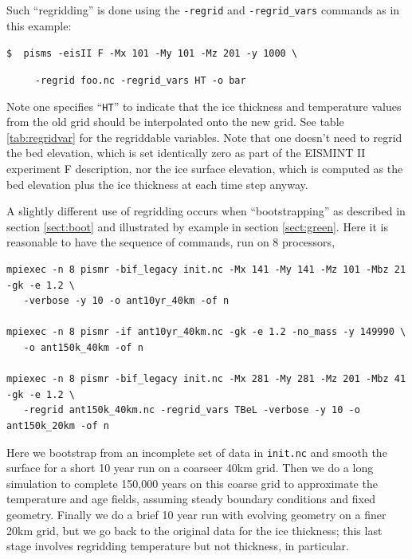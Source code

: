 \documentclass[11pt,final]{amsart}
\begin{document}
Such ``regridding'' is done using the \verb|-regrid| and \verb|-regrid_vars| commands as in this example:

\verb|$  pisms -eisII F -Mx 101 -My 101 -Mz 201 -y 1000 \|

\verb|     -regrid foo.nc -regrid_vars HT -o bar|

\noindent Note one specifies ``\verb|HT|'' to indicate that the ice thickness and temperature values from the old grid should be interpolated onto the new grid.  See table \ref{tab:regridvar} for the regriddable variables.  Note that one doesn't need to regrid the bed elevation, which is set identically zero as part of the EISMINT II experiment F description, nor the ice surface elevation, which is computed as the bed elevation plus the ice thickness at each time step anyway.

A slightly different use of regridding occurs when ``bootstrapping'' as described in section \ref{sect:boot} and illustrated by example in section \ref{sect:green}.  Here it is reasonable to have the sequence of commands, run on 8 processors,
\small
\begin{verbatim}
mpiexec -n 8 pismr -bif_legacy init.nc -Mx 141 -My 141 -Mz 101 -Mbz 21 -gk -e 1.2 \
   -verbose -y 10 -o ant10yr_40km -of n

mpiexec -n 8 pismr -if ant10yr_40km.nc -gk -e 1.2 -no_mass -y 149990 \
   -o ant150k_40km -of n

mpiexec -n 8 pismr -bif_legacy init.nc -Mx 281 -My 281 -Mz 201 -Mbz 41 -gk -e 1.2 \
   -regrid ant150k_40km.nc -regrid_vars TBeL -verbose -y 10 -o ant150k_20km -of n
\end{verbatim}
\normalsize
Here we bootstrap from an incomplete set of data in \verb|init.nc| and smooth the surface for a short 10 year run on a coarseer 40km grid.  Then we do a long simulation to complete 150,000 years on this coarse grid to approximate the temperature and age fields, assuming steady boundary conditions and fixed geometry.  Finally we do a brief 10 year run with evolving geometry on a finer 20km grid, but we go back to the original data for the ice thickness; this last stage involves regridding temperature but not thickness, in particular.
\end{document}
